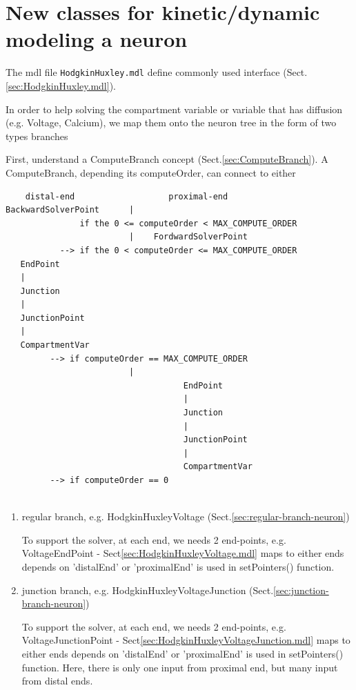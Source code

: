 \section{New classes for kinetic/dynamic modeling a neuron}

The mdl file \verb!HodgkinHuxley.mdl! define commonly used interface
(Sect.\ref{sec:HodgkinHuxley.mdl}).

In order to help solving the compartment variable or variable
that has diffusion (e.g. Voltage, Calcium), we map them onto 
the neuron tree in the form of two types branches

First, understand a ComputeBranch concept (Sect.\ref{sec:ComputeBranch}). 
A ComputeBranch, depending its computeOrder, can connect to either
\begin{verbatim}
    distal-end                   proximal-end
BackwardSolverPoint      |    
               if the 0 <= computeOrder < MAX_COMPUTE_ORDER    
                         |    FordwardSolverPoint 
           --> if the 0 < computeOrder <= MAX_COMPUTE_ORDER
   EndPoint                    
   |
   Junction
   |
   JunctionPoint
   |
   CompartmentVar
         --> if computeOrder == MAX_COMPUTE_ORDER
                         |    
                                    EndPoint                    
                                    |
                                    Junction
                                    |
                                    JunctionPoint
                                    |
                                    CompartmentVar
         --> if computeOrder == 0
            
\end{verbatim}


%   
%   
%   
%   

\begin{enumerate}
  \item regular branch, e.g. HodgkinHuxleyVoltage (Sect.\ref{sec:regular-branch-neuron})
  
  To support the solver, at each end, we needs 2 end-points, e.g.
  VoltageEndPoint - Sect\ref{sec:HodgkinHuxleyVoltage.mdl} maps to either ends
  depends on 'distalEnd' or 'proximalEnd' is used in setPointers() function.
  
  \item junction branch, e.g.  HodgkinHuxleyVoltageJunction
  (Sect.\ref{sec:junction-branch-neuron})

  To support the solver, at each end, we needs 2 end-points, e.g.
  VoltageJunctionPoint - Sect\ref{sec:HodgkinHuxleyVoltageJunction.mdl} maps to either
  ends depends on 'distalEnd' or 'proximalEnd' is used in setPointers()
  function. Here, there is only one input from proximal end, but many input from
  distal ends.

\end{enumerate}

